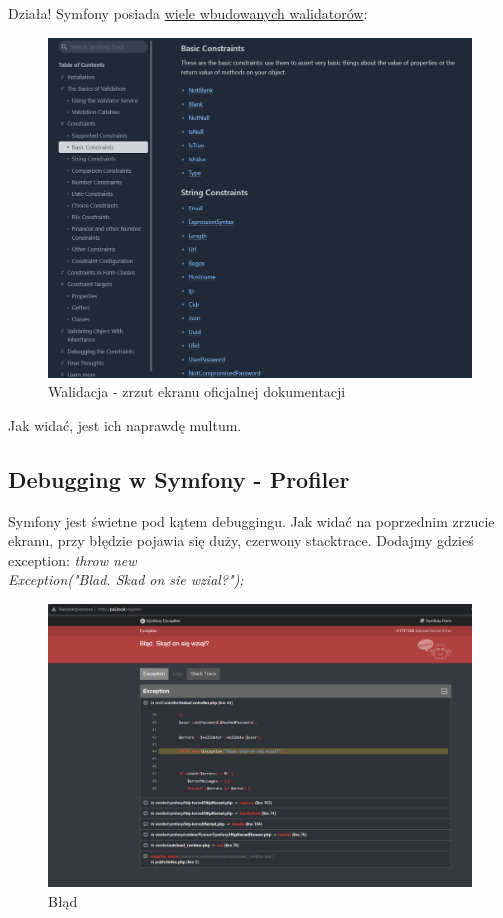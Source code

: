 \documentclass[polish, a4paper]{article}
\begin{document}
Działa! Symfony posiada \href{https://symfony.com/doc/current/validation.html}{wiele wbudowanych walidatorów}:

\begin{figure}[H]
  \centering
  \includegraphics[width=\textwidth]{walidacja.png}
  \caption{Walidacja - zrzut ekranu oficjalnej dokumentacji}
\end{figure}

Jak widać, jest ich naprawdę multum.

\subsection{Debugging w Symfony - Profiler}

Symfony jest świetne pod kątem debuggingu. Jak widać na poprzednim zrzucie ekranu, przy błędzie pojawia się duży, czerwony stacktrace. Dodajmy gdzieś exception: \emph{throw new \\Exception("Blad. Skad on sie wzial?");}

\begin{figure}[H]
  \centering
  \includegraphics[width=\textwidth]{blad2.png}
  \caption{Błąd}
\end{figure}
\end{document}
